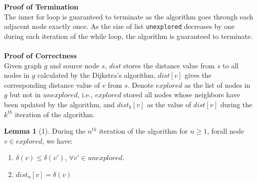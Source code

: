 \documentclass[11pt, a4paper]{article} %
\theoremstyle{definition}
\newtheorem*{lemma}{Lemma}
\begin{document}
\textbf{Proof of Termination}
\\
The inner for loop is guaranteed to terminate as the algorithm goes through each adjacent node exactly once. As the size of list \texttt{unexplored} decreases by one during each iteration of the while loop, the algorithm is guaranteed to terminate. 
\\\\
\textbf{Proof of Correctness}
\\
Given graph $g$ and source node $s$, $dist$ stores the distance value from $s$ to all nodes in $g$ calculated by the Dijkstra's algorithm, $dist[v]$ gives the corresponding distance value of $v$ from $s$. Denote $explored$ as the list of nodes in $g$ but not in $unexplored$, i.e., $explored$ stored all nodes whose neighbors have been updated by the algorithm, and $dist_{k}[v]$ as the value of $dist[v]$ during the $k^{th}$ iteration of the algorithm. 
\\
\begin{lemma}
[1] During the $n^{th}$ iteration of the algorithm for $n \geq 1$, forall node $v \in explored$, we have:
\begin{enumerate}
  \item $\delta(v) \leq \delta(v')$, $\forall v' \in unexplored$.
  \item $dist_n[v] = \delta(v)$
\end{enumerate}
\end{lemma}
\end{document}
